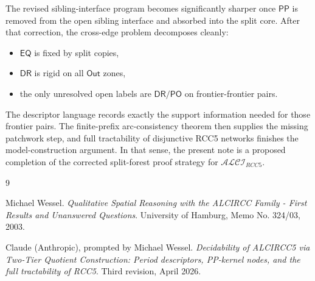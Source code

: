 \documentclass[11pt]{article}
\theoremstyle{remark}
\newcommand{\DR}{\mathsf{DR}}
\newcommand{\PO}{\mathsf{PO}}
\newcommand{\PP}{\mathsf{PP}}
\newcommand{\EQ}{\mathsf{EQ}}
\newcommand{\Out}{\mathsf{Out}}
\begin{document}
The revised sibling-interface program becomes significantly sharper once $\PP$ is removed from the open sibling interface and absorbed into the split core. After that correction, the cross-edge problem decomposes cleanly:
\begin{itemize}
    \item $\EQ$ is fixed by split copies,
    \item $\DR$ is rigid on all $\Out$ zones,
    \item the only unresolved open labels are $\DR/\PO$ on frontier-frontier pairs.
\end{itemize}
The descriptor language records exactly the support information needed for those frontier pairs. The finite-prefix arc-consistency theorem then supplies the missing patchwork step, and full tractability of disjunctive RCC5 networks finishes the model-construction argument. In that sense, the present note is a proposed completion of the corrected split-forest proof strategy for $\mathcal{ALCI}_{RCC5}$.

\begin{thebibliography}{9}

Michael Wessel.
\newblock \emph{Qualitative Spatial Reasoning with the ALCIRCC Family - First Results and Unanswered Questions}.
\newblock University of Hamburg, Memo No. 324/03, 2003.

Claude (Anthropic), prompted by Michael Wessel.
\newblock \emph{Decidability of ALCIRCC5 via Two-Tier Quotient Construction: Period descriptors, PP-kernel nodes, and the full tractability of RCC5}.
\newblock Third revision, April 2026.

\end{thebibliography}
\end{document}
